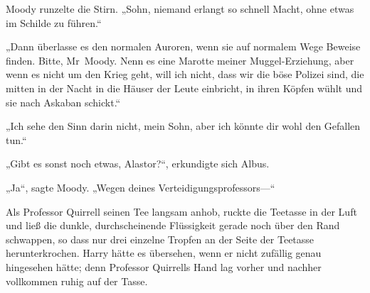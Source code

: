 Moody runzelte die Stirn. „Sohn, niemand erlangt so schnell Macht, ohne etwas im Schilde zu führen.“

„Dann überlasse es den normalen Auroren, wenn sie auf normalem Wege Beweise finden. Bitte, Mr~Moody. Nenn es eine Marotte meiner Muggel-Erziehung, aber wenn es nicht um den Krieg geht, will ich nicht, dass wir die böse Polizei sind, die mitten in der Nacht in die Häuser der Leute einbricht, in ihren Köpfen wühlt und sie nach Askaban schickt.“

„Ich sehe den Sinn darin nicht, mein Sohn, aber ich könnte dir wohl den Gefallen tun.“

„Gibt es sonst noch etwas, Alastor?“, erkundigte sich Albus.

„Ja“, sagte Moody. „Wegen deines Verteidigungsprofessors—“



Als Professor Quirrell seinen Tee langsam anhob, ruckte die Teetasse in der Luft und ließ die dunkle, durchscheinende Flüssigkeit gerade noch über den Rand schwappen, so dass nur drei einzelne Tropfen an der Seite der Teetasse herunterkrochen.
Harry hätte es übersehen, wenn er nicht zufällig genau hingesehen hätte; denn Professor Quirrells Hand lag vorher und nachher vollkommen ruhig auf der Tasse.

